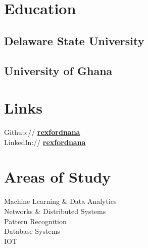 \documentclass[]{deedy-resume-openfont}
\begin{document}
%
%
\lastupdated

%
%



%
%

\begin{minipage}[t][18cm]{0.33\textwidth}


\section{Education}

\subsection{Delaware State University}
\sectionsep

\subsection{University of Ghana}
\sectionsep


\section{Links}
Github:// \href{https://github.com/rexfordnana}{\bf rexfordnana} \\
LinkedIn://  \href{https://www.linkedin.com/in/rexfordnana}{\bf rexfordnana} \\
\sectionsep


\section{Areas of Study}
Machine Learning \& Data Analytics \\
Networks \& Distributed Systems \\
Pattern Recognition \\
Database Systems \\
IOT \\
\sectionsep


\end{minipage}
\end{document}
